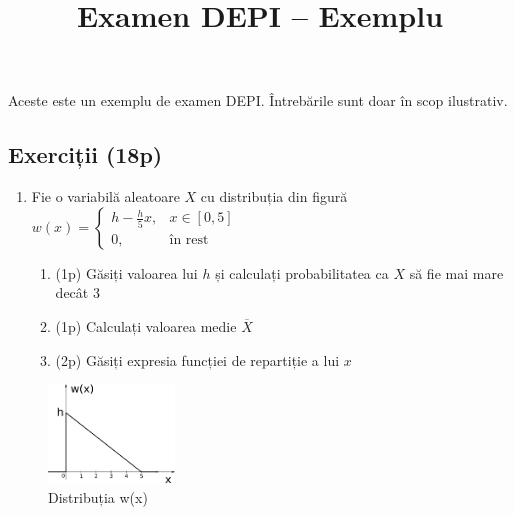\documentclass[12pt,]{scrartcl}
\title{Examen DEPI -- Exemplu}
\date{}
\providecommand{\tightlist}{%
  \setlength{\itemsep}{0pt}\setlength{\parskip}{0pt}}
\renewcommand{\vec}[1]{\mathbf{#1}}
\begin{document}
\maketitle

\newcommand*{\underuparrow}[1]{\ensuremath{\underset{\uparrow}{#1}}}
\renewcommand{\vec}[1]{\mathbf{#1}}
\newcommand{\erf}{\operatorname{erf}}


Aceste este un exemplu de examen DEPI. Întrebările sunt doar în scop
ilustrativ.

\subsection{Exerciții (18p)}\label{exerciux21bii-18p}

\begin{enumerate}
\def\labelenumi{\arabic{enumi}.}
\tightlist
\item
  Fie o variabilă aleatoare \(X\) cu distribuția din figură
  \(w(x)= \begin{cases} h-\frac{h}{5}x, & x \in [0,5] \\ 0, & \textrm{în rest} \end{cases}\)

  \begin{enumerate}
  \def\labelenumii{\alph{enumii}.}
  \tightlist
  \item
    (1p) Găsiți valoarea lui \(h\) și calculați probabilitatea ca \(X\)
    să fie mai mare decât 3
  \item
    (1p) Calculați valoarea medie \(\overline{X}\)
  \item
    (2p) Găsiți expresia funcției de repartiție a lui \(x\)
  \end{enumerate}
\end{enumerate}

\begin{figure}[htbp]
\centering
\includegraphics[width=0.30000\textwidth]{fig/PDF_LinearDown.png}
\caption{Distribuția w(x)}
\end{figure}

\smallbreak
\end{document}
